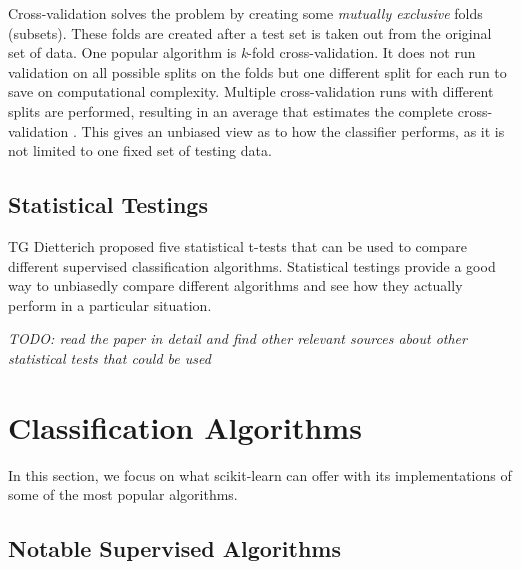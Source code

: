 \documentclass[11pt,openright,a4paper]{report}
\begin{document}
Cross-validation solves the problem by creating some \textit{mutually exclusive} folds (subsets). These folds are created after a test set is taken out from the original set of data. One popular algorithm is \textit{k}-fold cross-validation. It does not run validation on all possible splits on the folds but one different split for each run to save on computational complexity. Multiple cross-validation runs with different splits are performed, resulting in an average that estimates the complete cross-validation \cite{cross-val-kohavi}. This gives an unbiased view as to how the classifier performs, as it is not limited to one fixed set of testing data.

\subsection{Statistical Testings}
TG Dietterich \cite{t-test-paper} proposed five statistical t-tests that can be used to compare different supervised classification algorithms. Statistical testings provide a good way to unbiasedly compare different algorithms and see how they actually perform in a particular situation.

\textit{TODO: read the paper in detail and find other relevant sources about other statistical tests that could be used\cite{t-test-paper}}


\newpage
\section{Classification Algorithms}
In this section, we focus on what scikit-learn can offer with its implementations of some of the most popular algorithms.

\subsection{Notable Supervised Algorithms}
\end{document}

